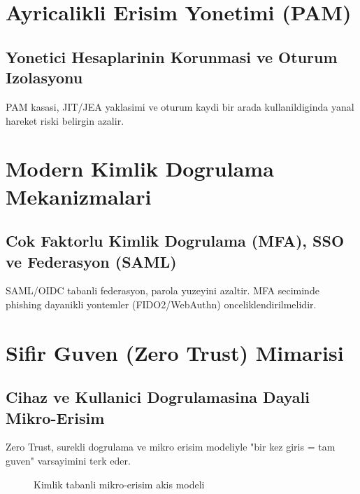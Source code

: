 \section{Ayricalikli Erisim Yonetimi (PAM)}
\subsection{Yonetici Hesaplarinin Korunmasi ve Oturum Izolasyonu}
PAM kasasi, JIT/JEA yaklasimi ve oturum kaydi bir arada kullanildiginda yanal hareket riski belirgin azalir.

\section{Modern Kimlik Dogrulama Mekanizmalari}
\subsection{Cok Faktorlu Kimlik Dogrulama (MFA), SSO ve Federasyon (SAML)}
SAML/OIDC tabanli federasyon, parola yuzeyini azaltir. MFA seciminde phishing dayanikli yontemler (FIDO2/WebAuthn) onceliklendirilmelidir.

\section{Sifir Guven (Zero Trust) Mimarisi}
\subsection{Cihaz ve Kullanici Dogrulamasina Dayali Mikro-Erisim}
Zero Trust, surekli dogrulama ve mikro erisim modeliyle "bir kez giris = tam guven" varsayimini terk eder.
\begin{figure}[htbp]
\centering
{}
\caption{Kimlik tabanli mikro-erisim akis modeli}
\label{fig:ch4-zt-access}
\end{figure}
